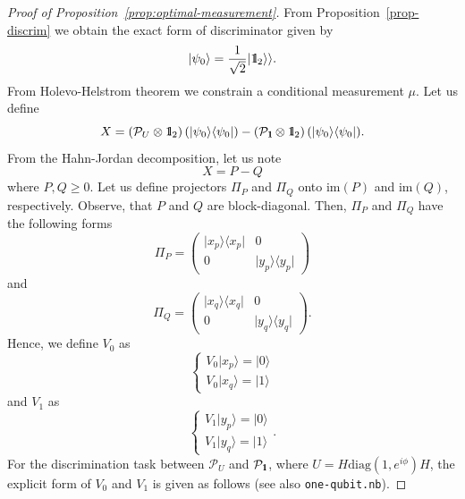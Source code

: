 \documentclass[preprint,12pt, a4paper]{elsarticle}
\newcommand{\ket}[1]{\ensuremath{|#1\rangle}}
\newcommand{\bra}[1]{\ensuremath{\langle#1|}}
\newcommand{\ketbra}[2]{\ensuremath{\ket{#1}\bra{#2}}}
\newcommand{\proj}[1]{\ensuremath{\ketbra{#1}{#1}}}
\newcommand{\1}{{\rm 1\hspace{-0.9mm}l}}
\newcommand{\Id}{{\rm 1\hspace{-0.9mm}l}}
\newcommand{\PP}{\mathcal{P}}
\newcommand{\diag}{\mathrm{diag}}
\begin{document}
\begin{proof}[Proof of Proposition~\ref{prop:optimal-measurement}]
	From Proposition~\ref{prop-discrim} we obtain the exact form of discriminator given by
	\begin{equation}
	\ket{\psi_0}  = \frac{1}{\sqrt{2}} |\Id_2 
	\rangle \rangle. 
	\end{equation}
	From Holevo-Helstrom theorem  we constrain a conditional measurement $\mu$.  
	Let us define 
	\begin{equation}
	X  = \left( \PP_U \otimes \Id_2 \right)(\proj{\psi_0}) -  \left( \PP_\Id 
	\otimes \Id_2 \right)(\proj{\psi_0}).
	\end{equation} 
	From the Hahn-Jordan decomposition, let us note
	\begin{equation}
	X = P - Q
	\end{equation}
	where $P, Q \ge 0 $. 
	Let us define projectors $\Pi_P$ and $\Pi_Q$ onto  $\text{im}(P)$ and $\text{im}(Q)$, 
	respectively. Observe, that $P $ and $Q$ are block-diagonal.  Then,  $\Pi_P$ and $\Pi_Q$ have the following forms
	\begin{equation}
	\Pi_P = \left(\begin{array}{cc}\proj{x_p}&0\\0&\proj{y_p}\end{array}\right) 
	\end{equation}
	and 
	\begin{equation}
	\Pi_Q = \left(\begin{array}{cc}\proj{x_q}&0\\0&\proj{y_q}\end{array}\right). 
	\end{equation}
	Hence, we define $V_0$ as
	\begin{equation}
	\begin{cases} V_0 \ket{x_p} = \ket{0} \\ V_0 \ket{x_q} = \ket{1} \end{cases}
	\end{equation}
	and $V_1$ as
	\begin{equation}
	\begin{cases} 
	V_1 \ket{y_p} = \ket{0} \\ 
	V_1 \ket{y_q} = \ket{1}
	\end{cases}. 
	\end{equation}
	For the discrimination task between $\PP_{U}$ and $\PP_{\Id}$, where $U = H 
	\diag(1, e^{i \phi })H$, the explicit form of $V_0$ and $V_1$ is given as 
	follows (see also \texttt{one-qubit.nb}).

\end{proof}
\end{document}

